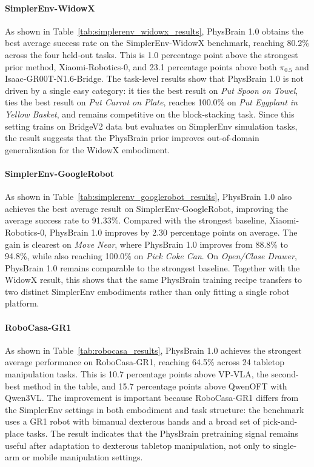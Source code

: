 \paragraph{SimplerEnv-WidowX}
As shown in Table~\ref{tab:simplerenv_widowx_results}, PhysBrain 1.0 obtains the best average success rate on the SimplerEnv-WidowX benchmark, reaching 80.2\% across the four held-out tasks. This is 1.0 percentage point above the strongest prior method, Xiaomi-Robotics-0, and 23.1 percentage points above both $\pi_{0.5}$ and Isaac-GR00T-N1.6-Bridge. The task-level results show that PhysBrain 1.0 is not driven by a single easy category: it ties the best result on \emph{Put Spoon on Towel}, ties the best result on \emph{Put Carrot on Plate}, reaches 100.0\% on \emph{Put Eggplant in Yellow Basket}, and remains competitive on the block-stacking task. Since this setting trains on BridgeV2 data but evaluates on SimplerEnv simulation tasks, the result suggests that the PhysBrain prior improves out-of-domain generalization for the WidowX embodiment.

\paragraph{SimplerEnv-GoogleRobot}
As shown in Table~\ref{tab:simplerenv_googlerobot_results}, PhysBrain 1.0 also achieves the best average result on SimplerEnv-GoogleRobot, improving the average success rate to 91.33\%. Compared with the strongest baseline, Xiaomi-Robotics-0, PhysBrain 1.0 improves by 2.30 percentage points on average. The gain is clearest on \emph{Move Near}, where PhysBrain 1.0 improves from 88.8\% to 94.8\%, while also reaching 100.0\% on \emph{Pick Coke Can}. On \emph{Open/Close Drawer}, PhysBrain 1.0 remains comparable to the strongest baseline. Together with the WidowX result, this shows that the same PhysBrain training recipe transfers to two distinct SimplerEnv embodiments rather than only fitting a single robot platform.

\paragraph{RoboCasa-GR1}
As shown in Table~\ref{tab:robocasa_results}, PhysBrain 1.0 achieves the strongest average performance on RoboCasa-GR1, reaching 64.5\% across 24 tabletop manipulation tasks. This is 10.7 percentage points above VP-VLA, the second-best method in the table, and 15.7 percentage points above QwenOFT with Qwen3VL. The improvement is important because RoboCasa-GR1 differs from the SimplerEnv settings in both embodiment and task structure: the benchmark uses a GR1 robot with bimanual dexterous hands and a broad set of pick-and-place tasks. The result indicates that the PhysBrain pretraining signal remains useful after adaptation to dexterous tabletop manipulation, not only to single-arm or mobile manipulation settings.

